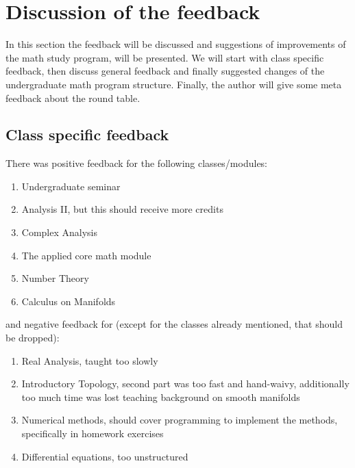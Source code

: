 \section{Discussion of the feedback}
\label{sec-1}
\label{sec:dis}
In this section the feedback will be discussed and suggestions of improvements of the math study program, will be presented. 
We will start with class specific feedback, then discuss general feedback and finally suggested changes of the undergraduate math program structure. 
Finally, the author will give some meta feedback about the round table.

\subsection{Class specific feedback}
\label{sec-1-1}
There was positive feedback for the following classes/modules:
\begin{enumerate}
\item Undergraduate seminar
\item Analysis II, but this should receive more credits
\item Complex Analysis
\item The applied core math module
\item Number Theory
\item Calculus on Manifolds
\end{enumerate}

and negative feedback for (except for the classes already mentioned, that should be dropped):
\begin{enumerate}
\item Real Analysis, taught too slowly
\item Introductory Topology, second part was too fast and hand-waivy, additionally too much time was lost teaching background on smooth manifolds
\item Numerical methods, should cover programming to implement the methods, specifically in homework exercises
\item Differential equations, too unstructured
\end{enumerate}


